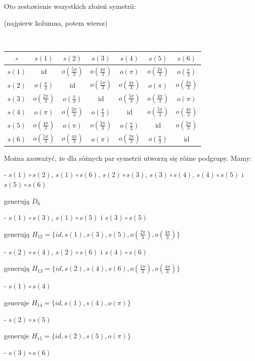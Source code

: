 \documentclass{article}
\begin{document}
Oto zestawienie wszystkich złożeń symetrii:
\begin{center}


(najpierw kolumna, potem wiersz)

\ 

\begin{tabular}{c|c c c c c c}
$\circ$ & $s(1)$ & $s(2)$ & $s(3)$ & $s(4)$ & $s(5)$ & $s(6)$ \\\hline
$s(1)$ & id & $o(\frac{5\pi}{3})$ & $o(\frac{4\pi}{3})$ & $o(\pi)$ & $o(\frac{2\pi}{3})$ &  $o(\frac{\pi}{3})$\\
$s(2)$ & $o(\frac{\pi}{3})$ & id & $o(\frac{5\pi}{3})$ &  $o(\frac{4\pi}{3})$ & $o(\pi)$ & $o(\frac{2\pi}{3})$\\
$s(3)$ & $o(\frac{2\pi}{3})$ & $o(\frac{\pi}{3})$ & id & $o(\frac{5\pi}{3})$ & $o(\frac{4\pi}{3})$ & $o(\pi)$\\
$s(4)$ & $o(\pi)$ & $o(\frac{2\pi}{3})$ & $o(\frac{\pi}{3})$ & id & $o(\frac{5\pi}{3})$  & $o(\frac{4\pi}{3})$\\
$s(5)$ & $o(\frac{4\pi}{3})$ & $o(\pi)$ & $o(\frac{2\pi}{3})$ & $o(\frac{\pi}{3})$ & id &$o(\frac{5\pi}{3})$ \\
$s(6)$ & $o(\frac{5\pi}{3})$ & $o(\frac{4\pi}{3})$ & $o(\pi)$ & $o(\frac{2\pi}{3})$ & $o(\frac{\pi}{3})$ & id 
\end{tabular}

\end{center}

Można zauważyć, że dla różnych par symetrii utworzą się różne podgrupy. Mamy:

- $s(1)\circ s(2)$, $s(1)\circ s(6)$, $s(2)\circ s(3)$, $s(3)\circ s(4)$, $s(4)\circ s(5)$ i $s(5)\circ s(6)$ 

generują $D_6$

- $s(1)\circ s(3)$, $s(1)\circ s(5)$ i $s(3)\circ s(5)$ 

generują $H_{12}=\{id,s(1),s(3),s(5), o(\frac{2\pi}{3}),o(\frac{4\pi}{3})\}$

- $s(2)\circ s(4)$, $s(2)\circ s(6)$ i $s(4)\circ s(6)$

generują $H_{13}=\{id,s(2),s(4),s(6), o(\frac{2\pi}{3}),o(\frac{4\pi}{3})\}$

- $s(1)\circ s(4)$ 

generuje $H_{14}=\{id,s(1),s(4),o(\pi)\}$

- $s(2)\circ s(5)$ 

generuje $H_{15}=\{id,s(2),s(5),o(\pi)\}$

- $s(3)\circ s(6)$ 
\end{document}

